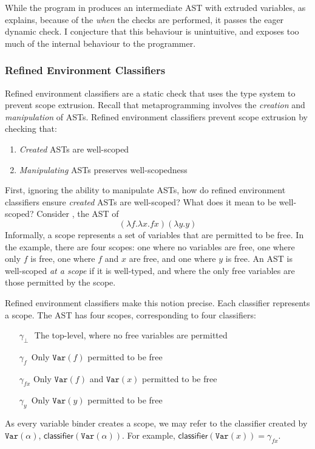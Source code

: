 While the program in  produces an intermediate AST with extruded variables, as  explains, because of the \textit{when} the checks are performed, it passes the eager dynamic check. I conjecture that this behaviour is unintuitive, and exposes too much of the internal behaviour to the programmer. 

\subsubsection{Refined Environment Classifiers}\label{subsubsection:refined-environment-classifiers}
Refined environment classifiers are a static check that uses the type system to prevent scope extrusion. Recall that metaprogramming involves the \textit{creation} and \textit{manipulation} of ASTs. Refined environment classifiers prevent scope extrusion by checking that:

\begin{enumerate}
  \item \textit{Created} ASTs are well-scoped
  \item \textit{Manipulating} ASTs preserves well-scopedness 
\end{enumerate}

First, ignoring the ability to manipulate ASTs, how do refined environment classifiers ensure \textit{created} ASTs are well-scoped? What does it mean to be well-scoped? Consider , the AST of 
\[(\lambda f. \lambda x. f x) (\lambda y. y)\]
Informally, a scope represents a set of variables that are permitted to be free. In the example, there are four scopes: one where no variables are free, one where only $f$ is free, one where $f$ and $x$ are free, and one where $y$ is free. An AST is well-scoped \textit{at a scope} if it is well-typed, and where the only free variables are those permitted by the scope. 

Refined environment classifiers make this notion precise. Each classifier represents a scope. The AST has four scopes, corresponding to four classifiers:
\begin{itemize}
\item[$\gamma_{\bot}$\,\,] The top-level, where no free variables are permitted 
\item[$\gamma_{f}$\;\,] Only $\texttt{Var}(f)$ permitted to be free
\item[$\gamma_{fx}$] Only $\texttt{Var}(f)$ and $\texttt{Var}(x)$ permitted to be free 
\item[$\gamma_{y}$\;\,] Only $\texttt{Var}(y)$ permitted to be free
\end{itemize}
As every variable binder creates a scope, we may refer to the classifier created by $\texttt{Var}(\alpha)$, $\textsf{classifier}(\texttt{Var}(\alpha))$. For example, $\textsf{classifier}(\texttt{Var}(x)) = \gamma_{fx}$.

